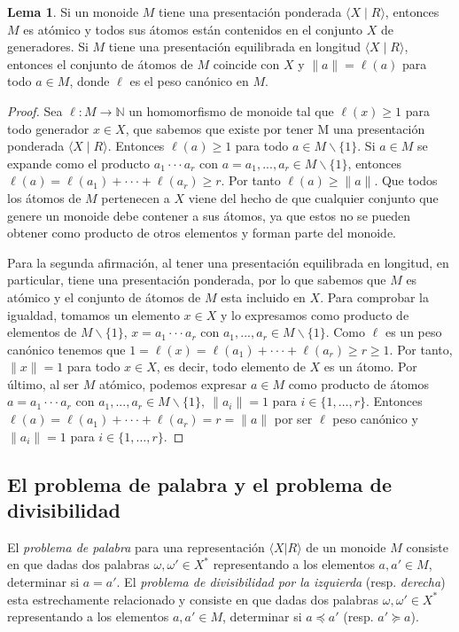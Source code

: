 \documentclass[12pt]{book}
\theoremstyle{definition}
\newtheorem{lema}{Lema}[section]
\providecommand{\norm}[1]{\lVert#1\rVert}
\begin{document}
\begin{lema}
Si un monoide $M$ tiene una presentación ponderada $\langle X\mid R\rangle$, entonces $M$ es atómico y todos sus átomos están contenidos en el conjunto $X$ de generadores. Si $M$ tiene una presentación equilibrada en longitud $\langle X\mid R\rangle$, entonces el conjunto de átomos de $M$ coincide con $X$ y $\norm{a}=\ell(a)$ para todo $a\in M$, donde $\ell$ es el peso canónico en $M$.
\label{lema:presen_mono}
\end{lema}

\begin{proof} Sea $\ell: M\rightarrow \mathbb{N}$ un homomorfismo de monoide tal que $\ell(x)\geq 1$ para todo generador $x\in X$, que sabemos que existe por tener M  una presentación ponderada $\langle X\mid R\rangle$. Entonces $\ell(a)\geq 1$ para todo $a\in M \backslash\{1\}$. Si $a\in M$ se expande como el producto $a_1\cdot\cdot\cdot a_r$ con $a = a_1,...,a_r\in M\backslash\{1\}$, entonces $\ell(a)=\ell(a_1)+\cdot\cdot\cdot+\ell(a_r)\geq r$. Por tanto $\ell(a)\geq \norm{a}$. Que todos los átomos de $M$ pertenecen a $X$ viene del hecho de que cualquier conjunto que genere un monoide debe contener a sus átomos, ya que estos no se pueden obtener como producto de otros elementos y forman parte del monoide. 

Para la segunda afirmación, al tener una presentación equilibrada en longitud, en particular, tiene una presentación ponderada, por lo que sabemos que $M$ es atómico y el conjunto de átomos de $M$ esta incluido en $X$. Para comprobar la igualdad, tomamos un elemento $x\in X$ y lo expresamos como producto de elementos de $M\backslash\{1\}$, $x = a_1\cdot\cdot\cdot a_r$ con $a_1,...,a_r\in M\backslash\{1\}$. Como $\ell$ es un peso canónico tenemos que $1=\ell(x)=\ell(a_1)+\cdot\cdot\cdot+\ell(a_r)\geq r\geq 1$. Por tanto, $\norm{x}=1$ para todo $x\in X$, es decir, todo elemento de $X$ es un átomo. Por último, al ser $M$ atómico, podemos expresar $a\in M$ como producto de átomos $a =a_1\cdot\cdot\cdot a_r$ con $a_1,...,a_r\in M\backslash\{1\},\ \norm{a_i}=1$  para $i\in\{1,\ldots,r\}$. Entonces $\ell(a)=\ell(a_1)+\cdot\cdot\cdot+\ell(a_r) = r = \norm{a}$ por ser $\ell$ peso canónico y $\norm{a_i}=1$ para $i\in\{1,\ldots,r\}$.
\end{proof}

\subsection{El problema de palabra y el problema de divisibilidad}
\label{sec:pro_palabra}
El \textit{problema de palabra} para una representación $\langle X|R\rangle$ de un monoide $M$ consiste en que dadas dos palabras $\omega,\omega'\in X^*$ representando a los elementos $a,a'\in M$, determinar si $a=a'$. El \textit{problema de divisibilidad por la izquierda} (resp. \textit{derecha}) esta estrechamente relacionado y consiste en que dadas
dos palabras $\omega,\omega'\in X^*$ representando a los elementos $a,a'\in M$, determinar si $a\preceq a'$ (resp. $a'\succeq a$).
\end{document}
